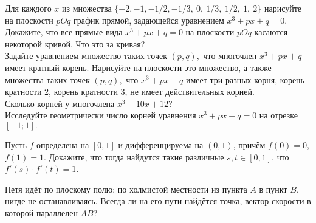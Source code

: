 \documentclass[a4paper, 12pt]{article}
\newcommand{\0}[1]{\overline{#1}}
\begin{document}
Для каждого $x$ из множества
$\{-2,-1,-1/2,-1/3,\ 0,\ 1/3,\ 1/2,\ 1,\ 2\}$ нарисуйте на плоскости
$pOq$ график прямой, задающейся уравнением $x^3+px+q=0.$
Докажите, что все прямые вида $x^3+px+q=0$ на плоскости $pOq$
касаются некоторой кривой. Что это за кривая?\\
 Задайте уравнением множество таких точек $(p,q),$ что
многочлен $x^3+px+q$ имеет кратный корень.
Нарисуйте на плоскости это множество, а также
множества таких точек $(p,q),$ что %
$x^3+px+q$  имеет три разных корня, корень кратности 2,
корень кратности 3,  не имеет действительных корней.\\
Сколько корней у многочлена $x^3-10x+12$?\\
Исследуйте геометрически число корней уравнения $x^3+px+q=0$ на
отрезке $[-1; 1].$





 Пусть $f$ определена на $[0,1]$ и дифференцируема на $(0,1)$, прич\"ем $f(0)=0$, $f(1)=1$. Докажите, что тогда найдутся
такие различные $s,t\in[0,1]$, что $f'(s)\cdot f'(t)=1$.



Петя ид\"ет  по плоскому полю;   по холмистой местности из пункта $A$
в пункт $B$, нигде не останавливаясь.
Всегда ли на его пути найд\"ется точка, вектор скорости
в которой параллелен $AB$? %
\end{document}
